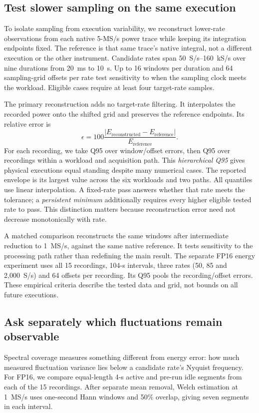 \documentclass[a4paper,UKenglish,cleveref,autoref]{oasics-v2021}
\begin{document}
\subsection{Test slower sampling on the same execution}
\label{sec:common}
To isolate sampling from execution variability, we reconstruct lower-rate observations from each native 5-MS/s power trace while keeping its integration endpoints fixed. The reference is that same trace's native integral, not a different execution or the other instrument. Candidate rates span 50~S/s--160~kS/s over nine durations from 20~ms to 10~s. Up to 16 windows per duration and 64 sampling-grid offsets per rate test sensitivity to when the sampling clock meets the workload. Eligible cases require at least four target-rate samples.

The primary reconstruction adds no target-rate filtering. It interpolates the recorded power onto the shifted grid and preserves the reference endpoints. Its relative error is
\begin{equation}
 \epsilon=100\frac{|E_{\mathrm{reconstructed}}-E_{\mathrm{reference}}|}
 {E_{\mathrm{reference}}}.
 \label{eq:error}
\end{equation}
For each recording, we take Q95 over window/offset errors, then Q95 over recordings within a workload and acquisition path. This \emph{hierarchical Q95} gives physical executions equal standing despite many numerical cases. The reported envelope is its largest value across the six workloads and two paths. All quantiles use linear interpolation. A fixed-rate pass answers whether that rate meets the tolerance; a \emph{persistent minimum} additionally requires every higher eligible tested rate to pass. This distinction matters because reconstruction error need not decrease monotonically with rate.

A matched comparison reconstructs the same windows after intermediate reduction to 1~MS/s, against the same native reference. It tests sensitivity to the processing path rather than redefining the main result. The separate FP16 energy experiment uses all 15 recordings, 104-s intervals, three rates (50, 85 and 2,000~S/s) and 64 offsets per recording. Its Q95 pools the recording/offset errors. These empirical criteria describe the tested data and grid, not bounds on all future executions.

\subsection{Ask separately which fluctuations remain observable}
\label{sec:psd-method}
Spectral coverage measures something different from energy error: how much measured fluctuation variance lies below a candidate rate's Nyquist frequency. For FP16, we compare equal-length 4-s active and pre-run idle segments from each of the 15 recordings. After separate mean removal, Welch estimation at 1~MS/s uses one-second Hann windows and 50\% overlap, giving seven segments in each interval.
\end{document}
